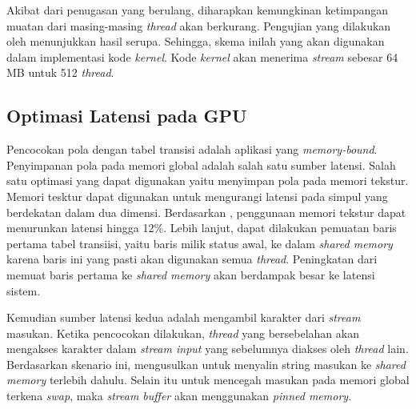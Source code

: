      Akibat dari penugasan yang berulang, diharapkan kemungkinan ketimpangan muatan dari masing-masing \emph{thread} akan berkurang. Pengujian yang dilakukan oleh \cite{lin2013} menunjukkan hasil serupa. Sehingga, skema inilah yang akan digunakan dalam implementasi kode \emph{kernel}. Kode \emph{kernel} akan menerima \emph{stream} sebesar 64 MB untuk 512 \emph{thread}.
      
      
      
      \subsection{Optimasi Latensi pada GPU}
      
      Pencocokan pola dengan tabel transisi adalah aplikasi yang \emph{memory-bound}. Penyimpanan pola pada memori global adalah salah satu sumber latensi. Salah satu optimasi yang dapat digunakan yaitu menyimpan pola pada memori tekstur. Memori tesktur dapat digunakan untuk mengurangi latensi pada simpul yang berdekatan dalam dua dimensi. Berdasarkan \cite{lin2013}, penggunaan memori tekstur dapat menurunkan latensi hingga 12\%. Lebih lanjut, dapat dilakukan pemuatan baris pertama tabel transiisi, yaitu baris milik status awal, ke dalam \emph{shared memory} karena baris ini yang pasti akan digunakan semua \emph{thread}. Peningkatan dari memuat baris pertama ke \emph{shared memory} akan berdampak besar ke latensi sistem.
      
      
      Kemudian sumber latensi kedua adalah mengambil karakter dari \emph{stream} masukan. Ketika pencocokan dilakukan, \emph{thread} yang bersebelahan akan mengakses karakter dalam \emph{stream input} yang sebelumnya diakses oleh \emph{thread} lain. Berdasarkan skenario ini, \cite{lin2013} mengusulkan untuk menyalin string masukan ke \emph{shared memory} terlebih dahulu. Selain itu untuk mencegah masukan pada memori global terkena \emph{swap}, maka \emph{stream buffer} akan menggunakan \emph{pinned memory}. 

